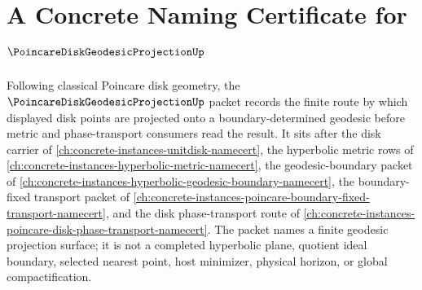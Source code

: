 \chapter{A Concrete Naming Certificate for $\PoincareDiskGeodesicProjectionUp$}
\label{ch:concrete-instances-poincare-disk-geodesic-projection-namecert}

Following classical Poincare disk geometry, the $\PoincareDiskGeodesicProjectionUp$ packet records the finite route by which displayed disk points are projected onto a boundary-determined geodesic before metric and phase-transport consumers read the result. It sits after the disk carrier of \autoref{ch:concrete-instances-unitdisk-namecert}, the hyperbolic metric rows of \autoref{ch:concrete-instances-hyperbolic-metric-namecert}, the geodesic-boundary packet of \autoref{ch:concrete-instances-hyperbolic-geodesic-boundary-namecert}, the boundary-fixed transport packet of \autoref{ch:concrete-instances-poincare-boundary-fixed-transport-namecert}, and the disk phase-transport route of \autoref{ch:concrete-instances-poincare-disk-phase-transport-namecert}. The packet names a finite geodesic projection surface; it is not a completed hyperbolic plane, quotient ideal boundary, selected nearest point, host minimizer, physical horizon, or global compactification.

